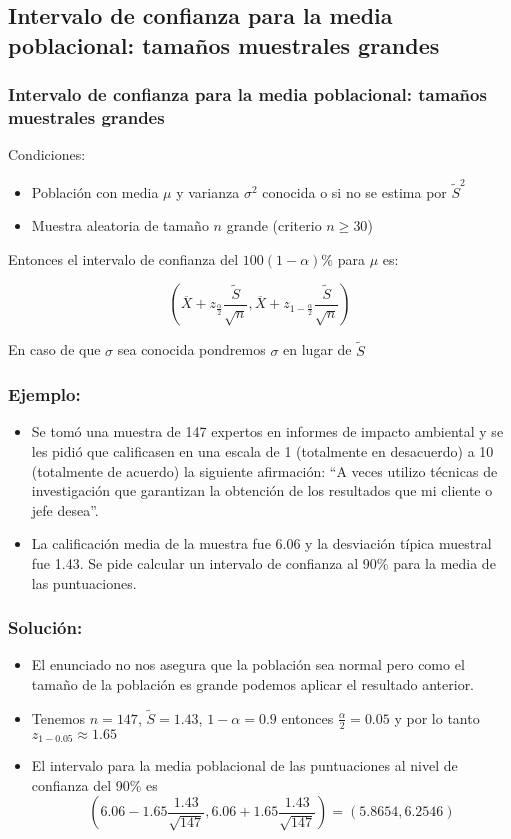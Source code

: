 \subsection{Intervalo de confianza para la media
        poblacional: tamaños muestrales grandes}

\begin{frame}
        \frametitle{Intervalo de confianza para la media poblacional: tamaños muestrales grandes}

     Condiciones:

    \begin{itemize}
    \item Población con media $\mu$ y varianza $\sigma^2$ conocida
    o  si no se estima por $\tilde{S}^2$
    \item Muestra aleatoria de tamaño $n$ grande (criterio $n\geq 30$)
    \end{itemize}

    Entonces el intervalo de confianza del $100(1-\alpha)\%$ para $\mu$
    es:

    $$\left( \overline{X}+z_{\frac{\alpha}{2}}\frac{\tilde{S}}{\sqrt{n}},
    \overline{X}+z_{1-\frac{\alpha}{2}}\frac{\tilde{S}}{\sqrt{n}}\right)$$

    En caso de que $\sigma$ sea conocida pondremos $\sigma$ en lugar de $\tilde{S}$
\end{frame}

\begin{frame}
    \frametitle{Ejemplo:}
\begin{itemize}
\item Se tomó una muestra de 147 expertos en informes de impacto ambiental y se les pidió que calificasen en una escala de 1 (totalmente en desacuerdo) a 10 (totalmente de acuerdo) la siguiente afirmación: ``A veces utilizo técnicas de investigación que garantizan la obtención de los resultados que mi cliente o jefe desea''.
\item La calificación media de la muestra fue $6.06$ y la desviación típica muestral fue 1.43. Se pide calcular un intervalo de confianza al 90\% para la media de las puntuaciones.
\end{itemize}    
\end{frame}

\begin{frame}
\frametitle{Solución:}
\begin{itemize}
\item  El enunciado no nos asegura que la población sea normal pero como el tamaño de la población es grande podemos aplicar el resultado anterior.
\item Tenemos $n=147$, $\tilde{S}=1.43$, $1-\alpha=0.9$ entonces $\frac{\alpha}{2}=0.05$ y por lo tanto $z_{1-0.05}\approx 1.65$
\item El intervalo para la media poblacional de las puntuaciones  al nivel de confianza del 90\% es
$$\left(6.06-1.65 \frac{1.43}{\sqrt{147}},6.06+1.65\frac{1.43}{\sqrt{147}}\right)=\left(5.8654, 6.2546\right)$$
\end{itemize}
\end{frame}

